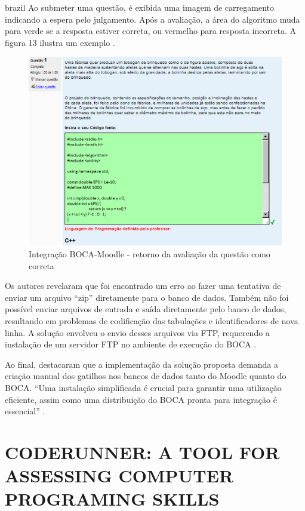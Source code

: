 \begin{otherlanguage*}{brazil}
Ao submeter uma questão, é exibida uma imagem de carregamento indicando a espera pelo julgamento. Após a avaliação, a área do algoritmo muda para verde se a resposta estiver correta, ou vermelho para resposta incorreta. A figura 13 ilustra um exemplo  \cite[p.~30]{galasso}.

\begin{figure}[h!]
	   \centering
            \caption{Integração BOCA-Moodle - retorno da avaliação da questão como correta}
            \label{fig:ModeloConceitual}
	   	\includegraphics[scale=0.5]{pictures/BOCA_correta.png}
\end{figure}

Os autores revelaram que foi encontrado um erro ao fazer uma tentativa de enviar um arquivo “zip” diretamente para o banco de dados. Também não foi possível enviar arquivos de entrada e saída diretamente pelo banco de dados, resultando em problemas de codificação das tabulações e identificadores de nova linha. A solução envolveu o envio desses arquivos via FTP, requerendo a instalação de um servidor FTP no ambiente de execução do BOCA \cite[p.~30]{galasso}.

Ao final, \textcite[p.~30-31]{galasso} destacaram que a implementação da solução proposta demanda a criação manual dos gatilhos nos bancos de dados tanto do Moodle quanto do BOCA. “Uma instalação simplificada é crucial para garantir uma utilização eficiente, assim como uma distribuição do BOCA pronta para integração é essencial” \cite[p.~31]{galasso}.


\section{CODERUNNER: A TOOL FOR ASSESSING COMPUTER PROGRAMING SKILLS}


\end{otherlanguage*}
